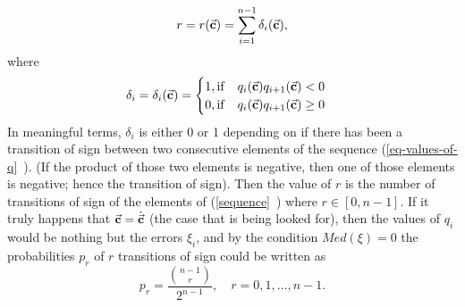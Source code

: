 \begin{equation}
r=r(\vec{\textbf{c}})=\sum\limits_{i=1}^{n-1} \delta_{i}(\vec{\textbf{c}}), \label{eq-values-of-q}
\end{equation}
where
\begin{equation}
\delta_{i}=\delta_{i}(\vec{\textbf{c}})=
\begin{cases} 
      1, \mathrm{if} \quad q_{i}(\vec{\textbf{c}})q_{i+1}(\vec{\textbf{c}})<0\\
      0, \mathrm{if} \quad q_{i}(\vec{\textbf{c}})q_{i+1}(\vec{\textbf{c}})\geq 0
   \end{cases}
\end{equation}
In meaningful terms, $\delta_{i}$ is either 0 or 1 depending on if there has been a transition of sign between two consecutive elements of the sequence (\vref{eq-values-of-q}~). (If the product of those two elements is negative, then one of those elements is negative; hence the transition of sign). Then the value of $r$ is the number of transitions of sign of the elements of  (\vref{sequence}~) where $r \in [0,n-1]$. If it truly happens that $\vec{\textbf{c}}=\dot{\vec{\textbf{c}}}$ (the case that is being looked for), then the values of $q_{i}$ would be nothing but the errors $\xi_{i}$, and by the condition $Med(\xi)=0$ the probabilities $p_{r}$ of  $r$ transitions of sign could be written as
\begin{equation}
p_{r}= \frac{\binom {n-1}r}{2^{n-1}}, \quad r = 0,1,\dots,n-1. \label{priori}
\end{equation}
